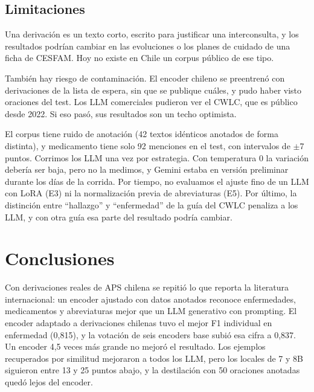 \documentclass[10pt,journal,a4paper]{IEEEtran}
\begin{document}
\subsection{Limitaciones}\label{sec:limitaciones}

Una derivación es un texto corto, escrito para justificar una interconsulta, y los resultados podrían cambiar en las evoluciones o los planes de cuidado de una ficha de CESFAM. Hoy no existe en Chile un corpus público de ese tipo.

También hay riesgo de contaminación. El encoder chileno se preentrenó con derivaciones de la lista de espera, sin que se publique cuáles, y pudo haber visto oraciones del test. Los LLM comerciales pudieron ver el CWLC, que es público desde 2022. Si eso pasó, sus resultados son un techo optimista.

El corpus tiene ruido de anotación (42 textos idénticos anotados de forma distinta), y medicamento tiene solo 92 menciones en el test, con intervalos de $\pm$7 puntos. Corrimos los LLM una vez por estrategia. Con temperatura 0 la variación debería ser baja, pero no la medimos, y Gemini estaba en versión preliminar durante los días de la corrida. Por tiempo, no evaluamos el ajuste fino de un LLM con LoRA (E3) ni la normalización previa de abreviaturas (E5). Por último, la distinción entre ``hallazgo'' y ``enfermedad'' de la guía del CWLC penaliza a los LLM, y con otra guía esa parte del resultado podría cambiar.

\section{Conclusiones}\label{sec:conclusiones}

Con derivaciones reales de APS chilena se repitió lo que reporta la literatura internacional: un encoder ajustado con datos anotados reconoce enfermedades, medicamentos y abreviaturas mejor que un LLM generativo con prompting. El encoder adaptado a derivaciones chilenas tuvo el mejor F1 individual en enfermedad (0,815), y la votación de seis encoders base subió esa cifra a 0,837. Un encoder 4,5 veces más grande no mejoró el resultado. Los ejemplos recuperados por similitud mejoraron a todos los LLM, pero los locales de 7 y 8B siguieron entre 13 y 25 puntos abajo, y la destilación con 50 oraciones anotadas quedó lejos del encoder.
\end{document}
